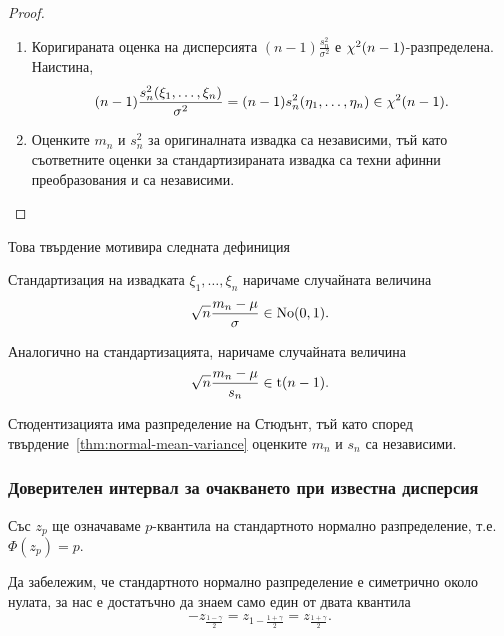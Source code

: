 \documentclass[numbers=endperiod, bibliography=totocnumbered]{scrartcl}
\begin{document}
\begin{proof}
\begin{enumerate}
    \item Коригираната оценка на дисперсията \( (n-1) \frac {s_n^2} {\sigma^2} \) е \( \operatorname{\chi^2}(n-1) \)-разпределена. Наистина,
    \begin{align*}
      (n-1) \frac {s_n^2(\xi_1, \ldots, \xi_n)} {\sigma^2}
      =
      (n-1) s_n^2(\eta_1, \ldots, \eta_n)
      \in
      \operatorname{\chi^2}(n - 1).
    \end{align*}

    \item Оценките \( m_n \) и \( s_n^2 \) за оригиналната извадка са независими, тъй като съответните оценки за стандартизираната извадка са техни афинни преобразования и са независими.
  \end{enumerate}
\end{proof}

Това твърдение мотивира следната дефиниция
\begin{definition}
  Стандартизация на извадката \( \xi_1, \ldots, \xi_n \) наричаме случайната величина
  \begin{align*}
    \sqrt n \frac {m_n - \mu} \sigma \in \operatorname{No}(0, 1).
  \end{align*}

  Аналогично на стандартизацията,  наричаме случайната величина
  \begin{align*}
    \sqrt n \frac {m_n - \mu} {s_n} \in \operatorname{t}(n - 1).
  \end{align*}
\end{definition}

\begin{note}
  Стюдентизацията има разпределение на Стюдънт, тъй като според твърдение~\ref{thm:normal-mean-variance} оценките \( m_n \) и \( s_n \) са независими.
\end{note}

\subsubsection{Доверителен интервал за очакването при известна дисперсия}

Със \( z_p \) ще означаваме \( p \)-квантила на стандартното нормално разпределение, т.е. \( \Phi(z_p) = p \).

Да забележим, че стандартното нормално разпределение е симетрично около нулата, за нас е достатъчно да знаем само един от двата квантила
\begin{align*}
  -z_{\frac {1-\gamma} 2}
  =
  z_{1-\frac {1+\gamma} 2}
  =
  z_{\frac {1+\gamma} 2}.
\end{align*}
\end{document}
